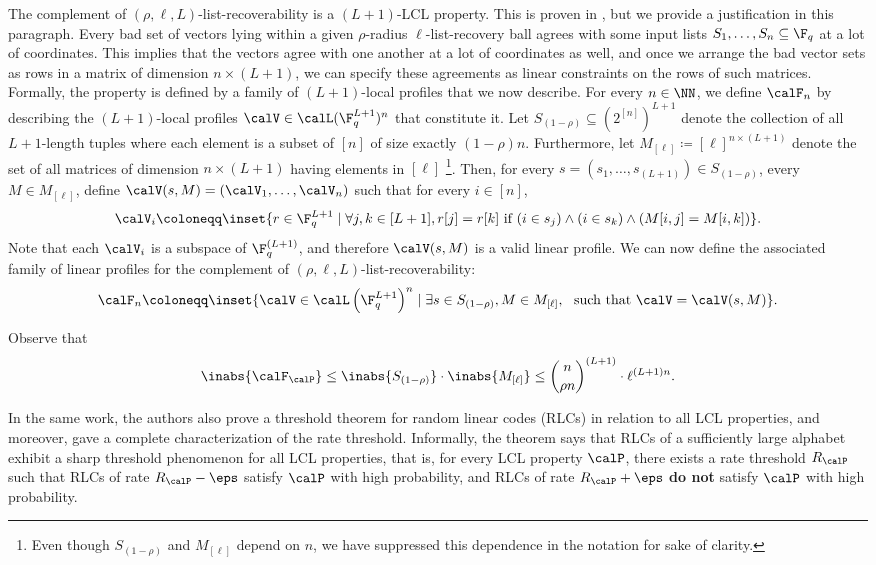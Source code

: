 \documentclass{article}
\begin{document}
The complement of $(\rho, \ell, L)$-list-recoverability is a $(L+1)$-LCL property. This is proven in \cite[Proposition 2.2]{levi2024random}, but we provide a justification in this paragraph.
Every bad set of vectors lying within a given $\rho$-radius $\ell$-list-recovery ball agrees with some input lists $S_1,\ldots,S_n \subseteq \F_q$ at a lot of coordinates.
This implies that the vectors agree with one another at a lot of coordinates as well, and once we arrange the bad vector sets as rows in a matrix of dimension $n \times (L+1)$, we can specify these agreements as linear constraints on the rows of such matrices.
Formally, the property is defined by a family of $(L+1)$-local profiles that we now describe.
For every $n \in \NN$, we define $\calF_n$ by describing the $(L+1)$-local profiles $\calV \in \calL(\F_q^{L+1})^n$ that constitute it.
Let $S_{(1-\rho)} \subseteq \left(2^{[n]}\right)^{L+1}$ denote the collection of all $L+1$-length tuples where each element is a subset of $[n]$ of size exactly $(1-\rho)n$.
Furthermore, let $M_{[\ell]} \coloneqq [\ell]^{n \times (L+1)}$ denote the set of all matrices of dimension $n \times (L+1)$ having elements in $[\ell]$ \footnote{Even though $S_{(1-\rho)}$ and $M_{[\ell]}$ depend on $n$, we have suppressed this dependence in the notation for sake of clarity.}.
Then, for every $s = (s_1,\ldots,s_{(L+1)}) \in S_{(1-\rho)}$, every $M \in M_{[\ell]}$, define $\calV(s, M) = (\calV_1,\ldots,\calV_n)$ such that for every $i \in [n]$,
\[
    \calV_i \coloneqq \inset{r \in \F_q^{L+1} \mid \forall j,k \in [L+1], r[j]=r[k] \textrm{ if } (i \in s_j) \land (i \in s_k) \land (M[i,j]=M[i,k])}.
\]
Note that each $\calV_i$ is a subspace of $\F_q^{(L+1)}$, and therefore $\calV(s, M)$ is a valid linear profile.
We can now define the associated family of linear profiles for the complement of $(\rho, \ell, L)$-list-recoverability:
\[
    \calF_n \coloneqq \inset{\calV \in \calL\left(\F_q^{L+1}\right)^n \mid \exists s \in S_{(1-\rho)}, M \in M_{[\ell]},~\textrm{ such that }\calV = \calV(s, M)}.
\]

Observe that
\begin{equation}\label{eq:up-bound-fam}
    \inabs{\calF_\calP} \le \inabs{S_{(1-\rho)}} \cdot \inabs{M_{[\ell]}} \le \binom{n}{\rho n}^{(L+1)} \cdot \ell^{(L+1)n}.
\end{equation}

In the same work, the authors also prove a threshold theorem for random linear codes (RLCs) in relation to all LCL properties, and moreover, gave a complete characterization of the rate threshold. Informally, the theorem says that RLCs of a sufficiently large alphabet exhibit a sharp threshold phenomenon for all LCL properties, that is, for every LCL property $\calP$, there exists a rate threshold $R_\calP$ such that RLCs of rate $R_\calP-\eps$ satisfy $\calP$ with high probability, and RLCs of rate $R_\calP+\eps$ \textbf{do not} satisfy $\calP$ with high probability.
\end{document}
